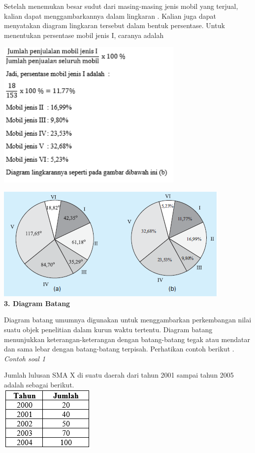 \documentclass[11pt,fleqn]{book} %
\begin{document}
{Setelah menemukan besar sudut dari masing-masing jenis mobil yang terjual, kalian dapat menggambarkannya dalam lingkaran .
Kalian juga dapat menyatakan diagram lingkaran tersebut dalam bentuk persentase. Untuk menentukan persentase mobil jenis I, caranya adalah 


\includegraphics[width = 9.1cm, height= 7.28cm]{Pictures/Gb12_diana.png}

\includegraphics[width = 11.48cm, height= 5.61cm]{Pictures/Gb13_diana.png}\\


\textbf{3.	Diagram Batang}


	Diagram batang umumnya digunakan untuk menggambarkan perkembangan nilai suatu objek penelitian dalam kurun waktu tertentu. Diagram batang menunjukkan keterangan-keterangan dengan batang-batang tegak atau mendatar dan sama lebar dengan batang-batang terpisah. Perhatikan contoh berikut .\\
	


\textit{Contoh soal 1}

Jumlah lulusan SMA X di suatu daerah dari tahun 2001 sampai tahun 2005 adalah sebagai berikut.\\


\includegraphics[width = 4.69cm, height= 3.2cm]{Pictures/Gb14_diana.png}\\

}
\end{document}
